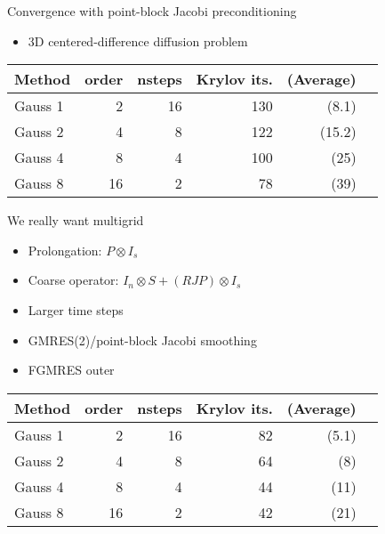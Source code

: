 \documentclass{beamer}
\begin{document}
\begin{frame}{Convergence with point-block Jacobi preconditioning}
  \begin{itemize}
  \item 3D centered-difference diffusion problem
  \end{itemize}
  \begin{tabular}{lrrrrr}
    \toprule
    Method & order & nsteps & Krylov its. & (Average) \\
    \midrule
    Gauss 1 & 2 & 16 & 130 & (8.1) \\
    Gauss 2 & 4 & 8 & 122 & (15.2) \\
    Gauss 4 & 8 & 4 & 100 & (25) \\
    Gauss 8 & 16 & 2 & 78 & (39) \\
    \bottomrule
  \end{tabular}
\end{frame}

\begin{frame}{We really want multigrid}
  \begin{itemize}
  \item Prolongation: $P \otimes I_s$
  \item Coarse operator: $I_n \otimes S + (R J P) \otimes I_s$
  \item Larger time steps
  \item GMRES(2)/point-block Jacobi smoothing
  \item FGMRES outer
  \end{itemize}
  \begin{tabular}{lrrrrr}
    \toprule
    Method & order & nsteps & Krylov its. & (Average) \\
    \midrule
    Gauss 1 & 2 & 16 & 82 & (5.1) \\
    Gauss 2 & 4 & 8 & 64 & (8) \\
    Gauss 4 & 8 & 4 & 44 & (11) \\
    Gauss 8 & 16 & 2 & 42 & (21) \\
    \bottomrule
  \end{tabular}
\end{frame}
\end{document}
